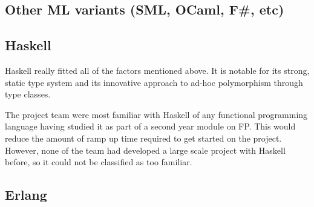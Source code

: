 
\subsection{Other ML variants (SML, OCaml, F\#, etc)}


\subsection{Haskell}


Haskell really fitted all of the factors mentioned above. It is notable for its strong, static type system and its innovative approach to ad-hoc polymorphism through type classes.\cite{wadler1989typeclasses}

The project team were most familiar with Haskell of any functional programming language having studied it as part of a second year module on FP. This would reduce the amount of ramp up time required to get started on the project. However, none of the team had developed a large scale project with Haskell before, so it could not be classified as too familiar.

\subsection{Erlang}


